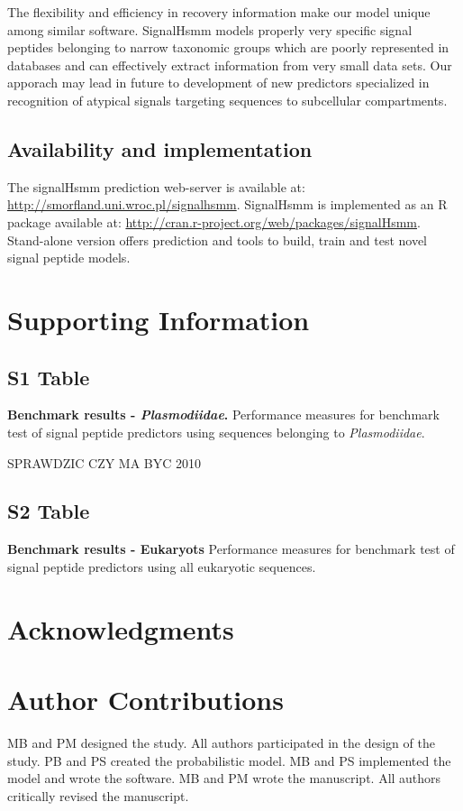 \documentclass[10pt,letterpaper]{article}
\begin{document}
The flexibility and efficiency in recovery information make our model unique among similar software. SignalHsmm models properly very specific signal peptides belonging to narrow taxonomic groups which are poorly represented in databases and can effectively extract information from very small data sets. Our apporach may lead in future to development of new predictors specialized in recognition of atypical signals targeting sequences to subcellular compartments.


\subsection*{Availability and implementation}
The signalHsmm prediction web-server is available at: \url{http://smorfland.uni.wroc.pl/signalhsmm}. SignalHsmm is implemented as an R package available at: \url{http://cran.r-project.org/web/packages/signalHsmm}. Stand-alone version offers prediction and tools to build, train and test novel signal peptide models.

\section*{Supporting Information}

\subsection*{S1 Table}
\label{tab:bench2010plas_full}
{\bf Benchmark results - \textit{Plasmodiidae}.} Performance measures for benchmark test of signal peptide predictors using sequences belonging to \textit{Plasmodiidae}.

SPRAWDZIC CZY MA BYC 2010

\subsection*{S2 Table}
\label{tab:bench2010_full}
{\bf Benchmark results - Eukaryots} Performance measures for benchmark test of signal peptide predictors using all eukaryotic sequences.

\section*{Acknowledgments}

\section*{Author Contributions}
MB and PM designed the study. All authors participated in the design of the study. PB and PS created the probabilistic model. MB and PS implemented the model and wrote the software. MB and PM wrote the manuscript. All authors critically revised the manuscript.
\end{document}
